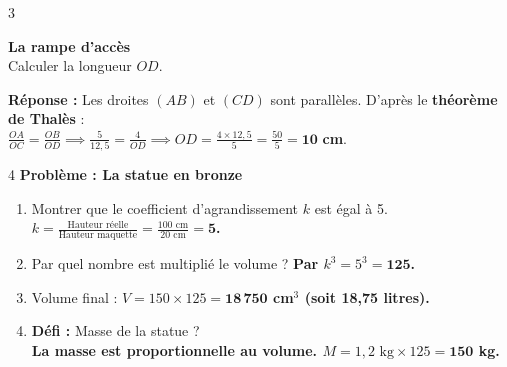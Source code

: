 \documentclass[a4paper]{book}
\begin{document}
{    \begin{exerciceNote}{3}
        \begin{minipage}{0.4\linewidth}
            \textbf{La rampe d'accès} \\
            Calculer la longueur $OD$.
        \end{minipage}
        \hfill
        \begin{minipage}{0.39\linewidth}
            \begin{center}
            \end{center}
        \end{minipage}
        
        \textbf{Réponse :} Les droites $(AB)$ et $(CD)$ sont parallèles. D'après le \textbf{théorème de Thalès} : \\
        $\frac{OA}{OC} = \frac{OB}{OD} \implies \frac{5}{12,5} = \frac{4}{OD} \implies OD = \frac{4 \times 12,5}{5} = \frac{50}{5} = \mathbf{10}$ \textbf{cm}.
    \end{exerciceNote}

    \begin{exerciceNote}{4}
        \textbf{Problème : La statue en bronze}
        \begin{enumerate}
            \item Montrer que le coefficient d'agrandissement $k$ est égal à 5. \\
            \textbf{$k = \frac{\text{Hauteur réelle}}{\text{Hauteur maquette}} = \frac{100 \text{ cm}}{20 \text{ cm}} = \mathbf{5}$.}
            \item Par quel nombre est multiplié le volume ? \textbf{Par $k^3 = 5^3 = \mathbf{125}$.}
            \item Volume final : \textbf{$V = 150 \times 125 = \mathbf{18\,750}$ cm$^3$ (soit 18,75 litres).}
            \item \textbf{Défi :} Masse de la statue ? \\
            \textbf{La masse est proportionnelle au volume. $M = 1,2 \text{ kg} \times 125 = \mathbf{150}$ kg.}
        \end{enumerate}
    \end{exerciceNote}

}
\end{document}
